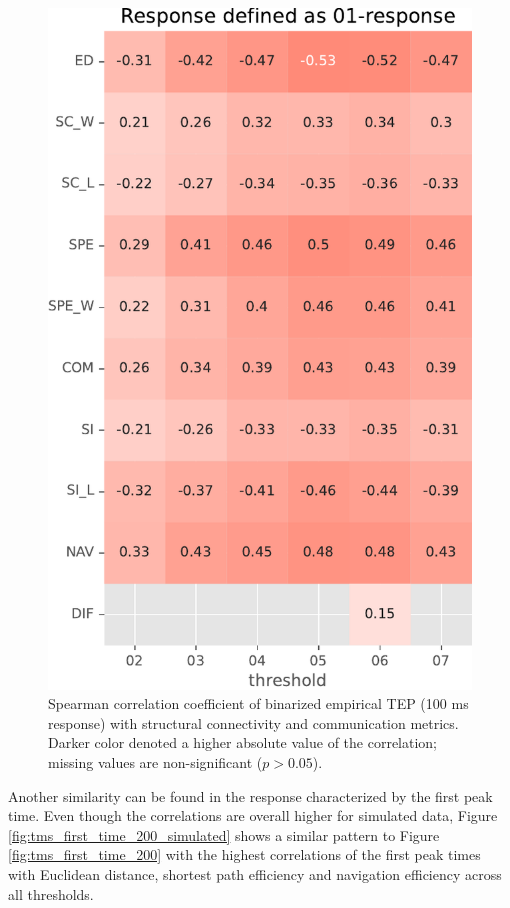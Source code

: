 \begin{figure}
    \centering
    \includegraphics[height=\textwidth]{images/nootebook_generated/pytepfit_results/simulated/100/not_over_threshold_nan/Response defined as 01-response.pdf}
    \caption[Binarized TEP (100 ms) correlations (simulated data)]{Spearman correlation coefficient of binarized empirical TEP (100 ms response) with structural connectivity and communication metrics. Darker color denoted a higher absolute value of the correlation; missing values are non-significant ($p>0.05$).}
    \label{fig:tms_binary_100_simulated}
\end{figure}

Another similarity can be found in the response characterized by the first peak time. Even though the correlations are overall higher for simulated data, Figure \ref{fig:tms_first_time_200_simulated} shows a similar pattern to Figure \ref{fig:tms_first_time_200} with the highest correlations of the first peak times with Euclidean distance, shortest path efficiency and navigation efficiency across all thresholds. 

